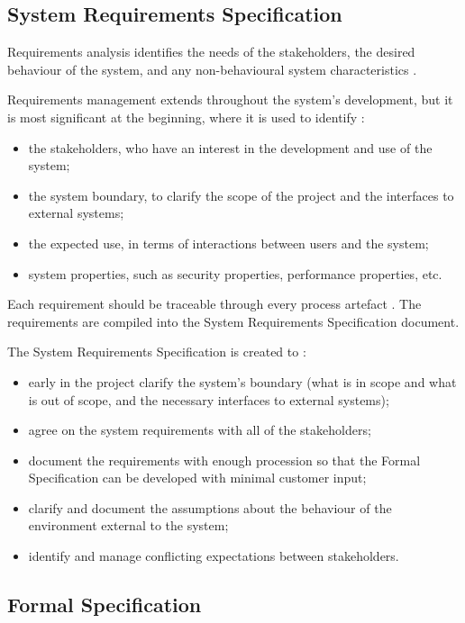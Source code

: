 \subsection{System Requirements Specification}

Requirements analysis identifies the needs of the stakeholders, the desired 
behaviour of the system, and any non-behavioural system characteristics \parencite{Tokeneer}. 

Requirements management extends throughout the system's development, but it is 
most significant at the beginning, where it is used to identify \parencite{Tokeneer}:
\begin{itemize}
	\item the stakeholders, who have an interest in the development and use of the system;
	\item the system boundary, to clarify the scope of the project and the interfaces to external systems;
	\item the expected use, in terms of interactions between users and the system;
	\item system properties, such as security properties, performance properties, etc.
\end{itemize}

Each requirement should be traceable through every process artefact \parencite{Tokeneer}.
The requirements are compiled into the System Requirements Specification document.

The System Requirements Specification is created to \parencite{Tokeneer}:
\begin{itemize}
	\item early in the project clarify the system's boundary (what is in scope 
		and what is out of scope, and the necessary interfaces to external systems);
	\item agree on the system requirements with all of the stakeholders;
	\item document the requirements with enough procession so that the Formal 
		Specification can be developed with minimal customer input;
	\item clarify and document the assumptions about the behaviour of the environment
		external to the system;
	\item identify and manage conflicting expectations between stakeholders.
\end{itemize}

\subsection{Formal Specification}

